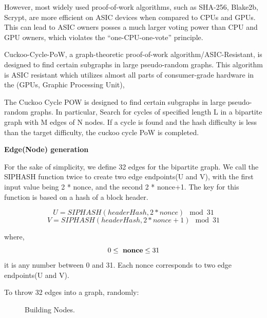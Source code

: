 \documentclass[a4paper,11pt]{article}
\begin{document}
However, most widely used proof-of-work algorithms, such as SHA-256, Blake2b, Scrypt, are more efficient on ASIC devices when compared to CPUs and GPUs. This can lead to ASIC owners posses a much larger voting power than CPU and GPU owners, which violates the “one-CPU-one-vote” principle.

Cuckoo-Cycle-PoW, a graph-theoretic proof-of-work algorithm/ASIC-Resistant, is designed to find certain subgraphs in large pseudo-random graphs. This algorithm is ASIC resistant which  utilizes almost all parts of consumer-grade hardware in the  (GPUs, Graphic Processing Unit),

The Cuckoo Cycle POW is designed to find certain subgraphs in large pseudo-random graphs. In particular, Search for cycles of specified length L in a bipartite graph with M edges of N nodes. If a cycle is found and the hash difficulty is less than the target difficulty, the cuckoo cycle PoW is completed.




\textbf{Edge(Node) generation}

For the sake of simplicity, we define 32 edges for the bipartite graph. We call the SIPHASH function twice to create two edge endpoints(U and V), with the first input value being 2 * nonce, and the second 2 * nonce+1. The key for this function is based on a hash of a block header.

\begin{equation}
{U = SIPHASH(headerHash, 2*nonce) \mod 31}
\end{equation}
\begin{equation}
{V = SIPHASH(headerHash, 2*nonce+1) \mod 31}
\end{equation}

where,
\begin{equation}
0\leq\ {\bf nonce} \leq 31
\end{equation}it is any number between 0 and 31. Each nonce corresponds to two edge endpoints(U and V).

To throw 32 edges into a graph, randomly:

\begin{figure}[ht]
	\centerline{%
	}
	\caption{Building Nodes.}
\end{figure}
\end{document}
